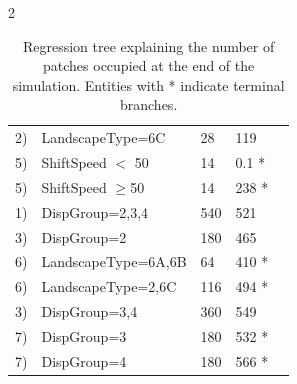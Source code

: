 \documentclass[12pt,pdftex]{article}
\begin{document}
\begin{spacing}{2}
\begin{table}
\begin{tabular}{lllll}
\hspace{0.8cm} 2) 				&LandscapeType=6C 				&28 										 		&119  \\		%

\hspace{2cm} 5) 				&ShiftSpeed $<$ 50 					&14 										  		&0.1 *\\		%

\hspace{2cm} 5) 				&ShiftSpeed $\geq$50 				&14 									 			&238 *\\		%

\hspace{0.4cm} 1) 				&DispGroup=2,3,4 					&540 										 	&521  \\		%

\hspace{1.2cm} 3) 				&DispGroup=2 					&180 											&465  \\		%

\hspace{2.4cm} 6) 				&LandscapeType=6A,6B 				&64 										 		&410 *\\		%

\hspace{2.4cm} 6) 				&LandscapeType=2,6C 				&116 									 		&494 *\\		%

\hspace{1.2cm} 3) 				&DispGroup=3,4 					&360 											&549  \\		%
	
\hspace{2.8cm} 7) 				&DispGroup=3 					&180 										 	&532 *\\		%

\hspace{2.8cm} 7)				&DispGroup=4 					&180											&566 *\\		%
\hline
\end{tabular}
\caption{Regression tree explaining the number of patches occupied at the end of the simulation. Entities with * indicate terminal branches.}
\end{table}


\end{spacing}
\end{document}
